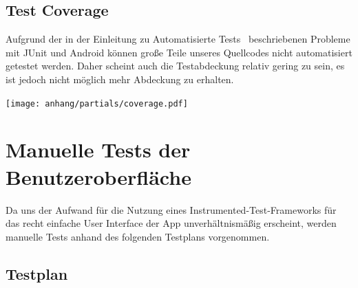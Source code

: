 









\subsection{Test Coverage}

Aufgrund der in der Einleitung zu \glqq Automatisierte Tests\grqq~ beschriebenen Probleme mit JUnit und Android können große Teile unseres Quellcodes nicht automatisiert getestet werden. Daher scheint auch die Testabdeckung relativ gering zu sein, es ist jedoch nicht möglich mehr Abdeckung zu erhalten.

\hspace{-1cm}
\texttt{[image: anhang/partials/coverage.pdf]}

\clearpage

\section{Manuelle Tests der Benutzeroberfläche}

Da uns der Aufwand für die Nutzung eines Instrumented-Test-Frameworks
für das recht einfache User Interface der App unverhältnismäßig
erscheint, werden manuelle Tests anhand des folgenden Testplans
vorgenommen.

\subsection{Testplan}


